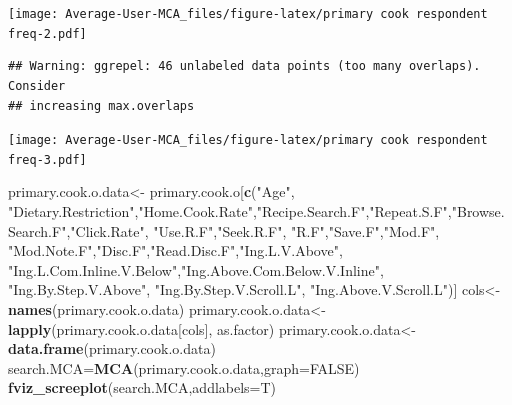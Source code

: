 \documentclass[
]{article}
\newenvironment{Shaded}{\begin{snugshade}}{\end{snugshade}}
\newcommand{\DataTypeTok}[1]{\textcolor[rgb]{0.13,0.29,0.53}{#1}}
\newcommand{\KeywordTok}[1]{\textcolor[rgb]{0.13,0.29,0.53}{\textbf{#1}}}
\newcommand{\NormalTok}[1]{#1}
\newcommand{\OtherTok}[1]{\textcolor[rgb]{0.56,0.35,0.01}{#1}}
\newcommand{\StringTok}[1]{\textcolor[rgb]{0.31,0.60,0.02}{#1}}
\begin{document}
\texttt{[image: Average-User-MCA\_files/figure-latex/primary cook respondent freq-2.pdf]}

\begin{Shaded}
\end{Shaded}

\begin{verbatim}
## Warning: ggrepel: 46 unlabeled data points (too many overlaps). Consider
## increasing max.overlaps
\end{verbatim}

\texttt{[image: Average-User-MCA\_files/figure-latex/primary cook respondent freq-3.pdf]}

\begin{Shaded}
\begin{Highlighting}[]
\NormalTok{primary.cook.o.data<-}\StringTok{ }\NormalTok{primary.cook.o[}\KeywordTok{c}\NormalTok{(}\StringTok{"Age"}\NormalTok{, }\StringTok{"Dietary.Restriction"}\NormalTok{,}\StringTok{"Home.Cook.Rate"}\NormalTok{,}\StringTok{"Recipe.Search.F"}\NormalTok{,}\StringTok{"Repeat.S.F"}\NormalTok{,}\StringTok{"Browse.Search.F"}\NormalTok{,}\StringTok{"Click.Rate"}\NormalTok{,}
            \StringTok{"Use.R.F"}\NormalTok{,}\StringTok{"Seek.R.F"}\NormalTok{, }\StringTok{"R.F"}\NormalTok{,}\StringTok{"Save.F"}\NormalTok{,}\StringTok{"Mod.F"}\NormalTok{, }\StringTok{"Mod.Note.F"}\NormalTok{,}\StringTok{"Disc.F"}\NormalTok{,}\StringTok{"Read.Disc.F"}\NormalTok{,}\StringTok{"Ing.L.V.Above"}\NormalTok{,}
            \StringTok{"Ing.L.Com.Inline.V.Below"}\NormalTok{,}\StringTok{"Ing.Above.Com.Below.V.Inline"}\NormalTok{,  }\StringTok{"Ing.By.Step.V.Above"}\NormalTok{,  }\StringTok{"Ing.By.Step.V.Scroll.L"}\NormalTok{,}
            \StringTok{"Ing.Above.V.Scroll.L"}\NormalTok{)]}
\NormalTok{cols<-}\KeywordTok{names}\NormalTok{(primary.cook.o.data)}
\NormalTok{primary.cook.o.data<-}\KeywordTok{lapply}\NormalTok{(primary.cook.o.data[cols], as.factor)}
\NormalTok{primary.cook.o.data<-}\KeywordTok{data.frame}\NormalTok{(primary.cook.o.data)}
\NormalTok{search.MCA=}\KeywordTok{MCA}\NormalTok{(primary.cook.o.data,}\DataTypeTok{graph=}\OtherTok{FALSE}\NormalTok{)}
\KeywordTok{fviz_screeplot}\NormalTok{(search.MCA,}\DataTypeTok{addlabels=}\NormalTok{T)}
\end{Highlighting}
\end{Shaded}
\end{document}
